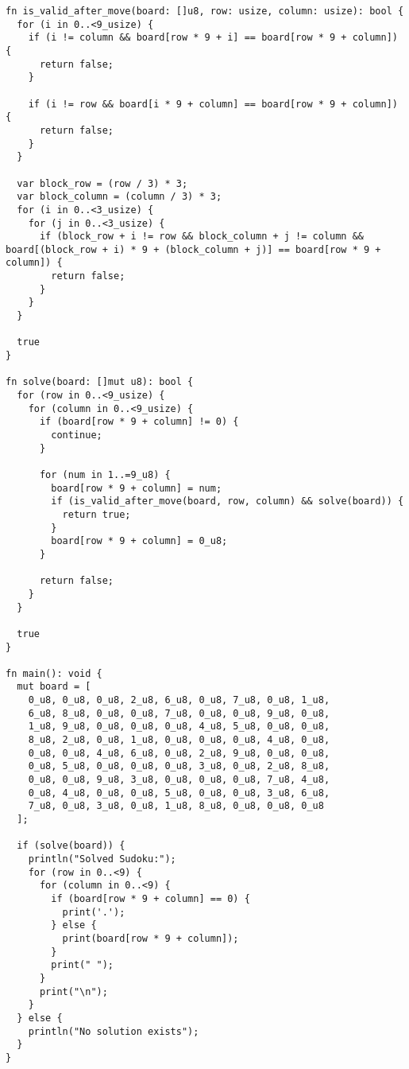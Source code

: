 \begin{mdframed}[style=examplestyle]
	\begin{verbatim}
fn is_valid_after_move(board: []u8, row: usize, column: usize): bool {
  for (i in 0..<9_usize) {
    if (i != column && board[row * 9 + i] == board[row * 9 + column]) {
      return false;
    }

    if (i != row && board[i * 9 + column] == board[row * 9 + column]) {
      return false;
    }
  }

  var block_row = (row / 3) * 3;
  var block_column = (column / 3) * 3;
  for (i in 0..<3_usize) {
    for (j in 0..<3_usize) {
      if (block_row + i != row && block_column + j != column && board[(block_row + i) * 9 + (block_column + j)] == board[row * 9 + column]) {
        return false;
      }
    }
  }

  true
}

fn solve(board: []mut u8): bool {
  for (row in 0..<9_usize) {
    for (column in 0..<9_usize) {
      if (board[row * 9 + column] != 0) {
        continue;
      }

      for (num in 1..=9_u8) {
        board[row * 9 + column] = num;
        if (is_valid_after_move(board, row, column) && solve(board)) {
          return true;
        }
        board[row * 9 + column] = 0_u8;
      }

      return false;
    }
  }

  true
}

fn main(): void {
  mut board = [
    0_u8, 0_u8, 0_u8, 2_u8, 6_u8, 0_u8, 7_u8, 0_u8, 1_u8,
    6_u8, 8_u8, 0_u8, 0_u8, 7_u8, 0_u8, 0_u8, 9_u8, 0_u8,
    1_u8, 9_u8, 0_u8, 0_u8, 0_u8, 4_u8, 5_u8, 0_u8, 0_u8,
    8_u8, 2_u8, 0_u8, 1_u8, 0_u8, 0_u8, 0_u8, 4_u8, 0_u8,
    0_u8, 0_u8, 4_u8, 6_u8, 0_u8, 2_u8, 9_u8, 0_u8, 0_u8,
    0_u8, 5_u8, 0_u8, 0_u8, 0_u8, 3_u8, 0_u8, 2_u8, 8_u8,
    0_u8, 0_u8, 9_u8, 3_u8, 0_u8, 0_u8, 0_u8, 7_u8, 4_u8,
    0_u8, 4_u8, 0_u8, 0_u8, 5_u8, 0_u8, 0_u8, 3_u8, 6_u8,
    7_u8, 0_u8, 3_u8, 0_u8, 1_u8, 8_u8, 0_u8, 0_u8, 0_u8
  ];

  if (solve(board)) {
    println("Solved Sudoku:");
    for (row in 0..<9) {
      for (column in 0..<9) {
        if (board[row * 9 + column] == 0) {
          print('.');
        } else {
          print(board[row * 9 + column]);
        }
        print(" ");
      }
      print("\n");
    }
  } else {
    println("No solution exists");
  }
}
	\end{verbatim}
\end{mdframed}

